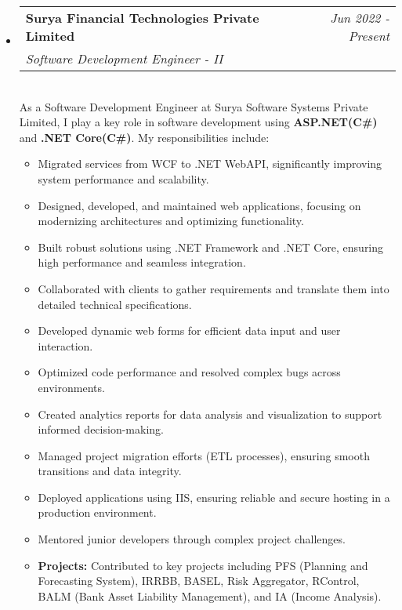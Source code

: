 \documentclass[a4paper,12pt]{article}
\makeatletter
\newcommand{\resumeSubHeadingListStart}{\begin{itemize}[leftmargin=*,labelsep=1mm,noitemsep]}
\newcommand{\resumeSubHeadingListEnd}{\end{itemize}\vspace{2mm}}
\newcommand{\resumeItemListStart}{\begin{itemize}[leftmargin=3ex, rightmargin=2ex, noitemsep,labelsep=1.2mm,itemsep=0mm]\small}
\newcommand{\resumeItemListEnd}{\end{itemize}\vspace{-2mm}}
\newcommand{\resumeExperience}[4]{
\vspace{0.5mm}\item
    \begin{tabular*}{0.98\textwidth}[t]{l@{\extracolsep{\fill}}r}
        \textbf{#1} & \textit{\footnotesize{#3}}\\
        \textit{\footnotesize{#2}} & {}
    \end{tabular*}\\ [1mm]
    \footnotesize{#4}
}
\newcommand{\emptyLine}{\\[-3mm]}
\makeatother
\begin{document}
\resumeSubHeadingListStart
\resumeExperience {Surya Financial Technologies Private Limited}
 {Software Development Engineer - II} {Jun 2022 - Present}
{
As a Software Development Engineer at Surya Software Systems Private Limited, I play a key role in software development using \textbf{ASP.NET(C\#)} and \textbf{.NET Core(C\#)}. My responsibilities include:
}\emptyLine
\resumeItemListStart
  \item Migrated services from WCF to .NET WebAPI, significantly improving system performance and scalability.
  \item Designed, developed, and maintained web applications, focusing on modernizing architectures and optimizing functionality.
  \item Built robust solutions using .NET Framework and .NET Core, ensuring high performance and seamless integration.
  \item Collaborated with clients to gather requirements and translate them into detailed technical specifications.
  \item Developed dynamic web forms for efficient data input and user interaction.
  \item Optimized code performance and resolved complex bugs across environments.
  \item Created analytics reports for data analysis and visualization to support informed decision-making.
  \item Managed project migration efforts (ETL processes), ensuring smooth transitions and data integrity.
  \item Deployed applications using IIS, ensuring reliable and secure hosting in a production environment.
  \item Mentored junior developers through complex project challenges.
  \item \textbf{Projects:} Contributed to key projects including PFS (Planning and Forecasting System), IRRBB, BASEL, Risk Aggregator, RControl, BALM (Bank Asset Liability Management), and IA (Income Analysis).
    \resumeItemListEnd
\resumeSubHeadingListEnd
\end{document}

